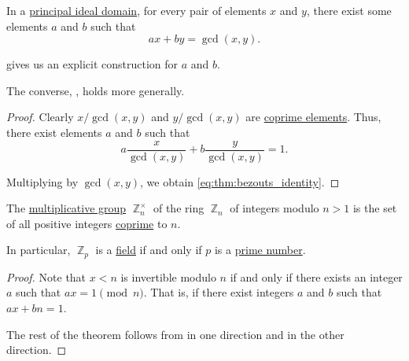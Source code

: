\begin{theorem}\label{thm:bezouts_identity}
  In a \hyperref[def:principal_ideal_domain]{principal ideal domain}, for every pair of elements \( x \) and \( y \), there exist some elements \( a \) and \( b \) such that
  \begin{equation}\label{eq:thm:bezouts_identity}
    ax + by = \gcd(x, y).
  \end{equation}

   gives us an explicit construction for \( a \) and \( b \).

  The converse, , holds more generally.
\end{theorem}
\begin{proof}
  Clearly \( x / \gcd(x, y) \) and \( y / \gcd(x, y) \) are \hyperref[def:coprime_elements]{coprime elements}. Thus, there exist elements \( a \) and \( b \) such that
  \begin{equation*}
    a \frac x {\gcd(x, y)} + b \frac y {\gcd(x, y)} = 1.
  \end{equation*}

  Multiplying by \( \gcd(x, y) \), we obtain \eqref{eq:thm:bezouts_identity}.
\end{proof}

\begin{corollary}\label{thm:multiplicative_group_of_integers_modulo}
  The \hyperref[def:semiring]{multiplicative group} \( \BbbZ_n^\times \) of the ring \hyperref[def:ring_of_integers_modulo]{\( \BbbZ_n \)} of integers modulo \( n > 1 \) is the set of all positive integers \hyperref[def:coprime_elements]{coprime} to \( n \).

  In particular, \( \BbbZ_p \) is a \hyperref[def:field]{field} if and only if \( p \) is a \hyperref[def:prime_number]{prime number}.
\end{corollary}
\begin{proof}
  Note that \( x < n \) is invertible modulo \( n \) if and only if there exists an integer \( a \) such that \( ax = 1 \pmod n \). That is, if there exist integers \( a \) and \( b \) such that \( ax + bn = 1 \).

  The rest of the theorem follows from  in one direction and  in the other direction.
\end{proof}

